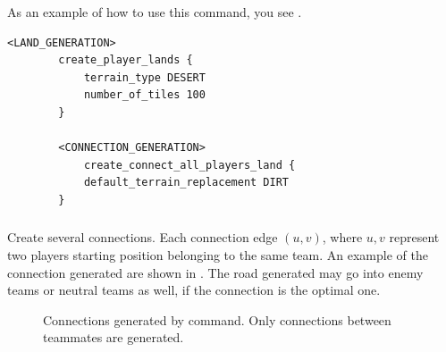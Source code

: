     As an example of how to use this command, you see .

    \begin{lstlisting}[language={rms}, label={lst:connectionplayers}, caption={Example showing how you can connect all players with dirt.}]
        <LAND_GENERATION>
        create_player_lands {
            terrain_type DESERT
            number_of_tiles 100
        }

        <CONNECTION_GENERATION>
            create_connect_all_players_land {
            default_terrain_replacement DIRT
        }
    \end{lstlisting}

    \subsubsection{}

    Create several connections. Each connection edge $(u,v)$, where $u,v$ represent two players starting position belonging to the same team. An example of the connection generated are shown in . The road generated may go into enemy teams or neutral teams as well, if the connection is the optimal one.

    \begin{figure}[ht]
        \centering
        \caption{Connections generated by  command. Only connections between teammates are generated.}
        \label{fig:createconnectteamslands}
    \end{figure}

